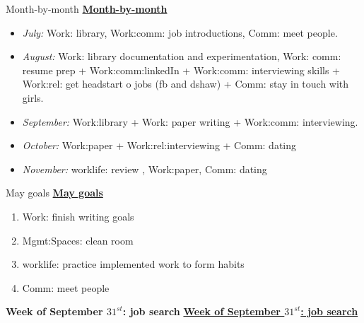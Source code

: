 \begin{columns}
\begin{column}{0.333\columnwidth}
\begin{columns}
\begin{column}{0.5\columnwidth}
\ifdefined\POSTER  
    \begin{block}{Month-by-month}
\else
\underline{\bf Month-by-month} 
\fi 
      \begin{itemize} 
      \item \small \textit{July:} Work: library, Work:comm: job
        introductions, Comm: meet people.
      \item \small \textit{August:} Work: library documentation and
      experimentation, Work: comm: resume prep + Work:comm:linkedIn +
      Work:comm: interviewing skills + Work:rel: get headstart o jobs (fb and dshaw) + Comm: stay in touch with girls. 
      \item \small \textit{September:} Work:library + Work: paper writing + Work:comm: interviewing. 
      \item \small \textit{October:} Work:paper +  Work:rel:interviewing + Comm: dating 
      \item \small \textit{November:} worklife: review , Work:paper, Comm: dating 
      \end{itemize}
\ifdefined\POSTER 
    \end{block}
\fi

\ifdefined\POSTER
\begin{block}{May goals}
\else
\underline{\bf May goals}\\
\fi 

\begin{enumerate} 
\item \small Work: finish writing goals
  \small \item \small Mgmt:Spaces: clean room 
\item \small worklife: practice implemented work to form habits 
\item \small Comm: meet people 
\end{enumerate}

\ifdefined\POSTER
\end{block}
\fi

\ifdefined\POSTER
\begin{block}{\small \bf Week of September $31^{st}$: job search}
\else
\underline{\bf Week of September $31^{st}$: job search}\\
\fi


\end{block}
\end{column}
\end{columns}
\end{column}
\end{columns}
